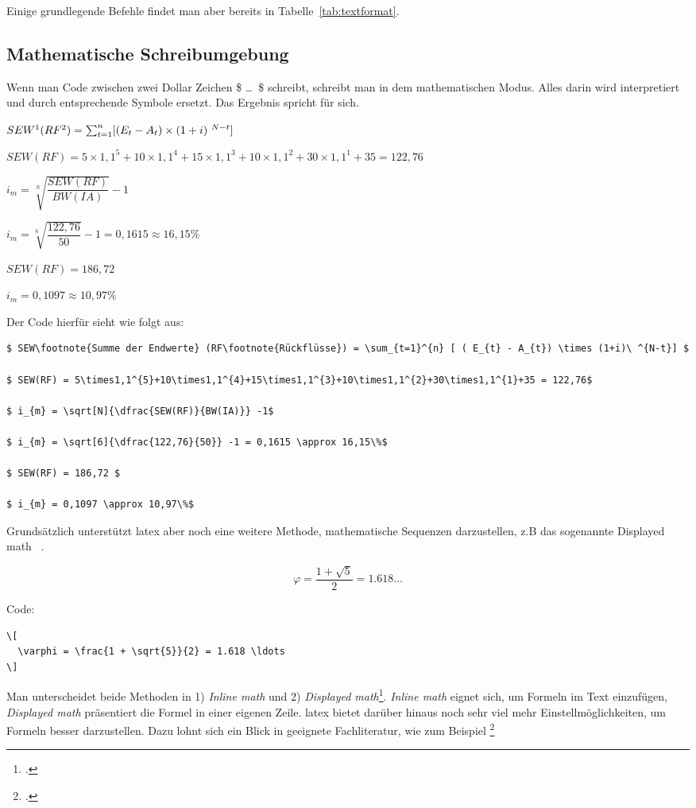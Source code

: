 Einige grundlegende Befehle findet man aber bereits in Tabelle~\ref{tab:textformat}.

\subsection{Mathematische Schreibumgebung}
\label{sec:math-umg}
Wenn man Code zwischen zwei Dollar Zeichen \$ \dots\ \$ schreibt, schreibt man in dem mathematischen Modus. Alles darin wird interpretiert und durch entsprechende Symbole ersetzt. Das Ergebnis spricht für sich.

$ SEW\footnote{Summe der Endwerte} (RF\footnote{Rückflüsse}) = \sum_{t=1}^{n} [ ( E_{t} - A_{t}) \times (1+i)\ ^{N-t}] $

$ SEW(RF) = 5\times1,1^{5}+10\times1,1^{4}+15\times1,1^{3}+10\times1,1^{2}+30\times1,1^{1}+35 = 122,76$

$ i_{m} = \sqrt[N]{\dfrac{SEW(RF)}{BW(IA)}} -1$

$ i_{m} = \sqrt[6]{\dfrac{122,76}{50}} -1 = 0,1615 \approx 16,15\%$

$ SEW(RF) = 186,72 $

$ i_{m} = 0,1097 \approx 10,97\%$

Der Code hierfür sieht wie folgt aus:
\begin{lstlisting}
$ SEW\footnote{Summe der Endwerte} (RF\footnote{Rückflüsse}) = \sum_{t=1}^{n} [ ( E_{t} - A_{t}) \times (1+i)\ ^{N-t}] $

$ SEW(RF) = 5\times1,1^{5}+10\times1,1^{4}+15\times1,1^{3}+10\times1,1^{2}+30\times1,1^{1}+35 = 122,76$

$ i_{m} = \sqrt[N]{\dfrac{SEW(RF)}{BW(IA)}} -1$

$ i_{m} = \sqrt[6]{\dfrac{122,76}{50}} -1 = 0,1615 \approx 16,15\%$

$ SEW(RF) = 186,72 $

$ i_{m} = 0,1097 \approx 10,97\%$
\end{lstlisting}

Grundsätzlich unterstützt \gls{latex} aber noch eine weitere Methode, mathematische Sequenzen darzustellen, z.B das sogenannte \glqq Displayed math \grqq\ .

\[
  \varphi = \frac{1 + \sqrt{5}}{2} = 1.618 \ldots
\]

Code:

\begin{lstlisting}
\[
  \varphi = \frac{1 + \sqrt{5}}{2} = 1.618 \ldots
\]
\end{lstlisting}

Man unterscheidet beide Methoden in 1) \emph{Inline math} und 2) \emph{Displayed math}\footcite[Vgl. ][S. 276]{kottwitzLaTeXCookbook902015}. \emph{Inline math} eignet sich, um Formeln im Text einzufügen, \emph{Displayed math} präsentiert die Formel in einer eigenen Zeile.
\gls{latex} bietet darüber hinaus noch sehr viel mehr Einstellmöglichkeiten, um Formeln besser darzustellen. Dazu lohnt sich ein Blick in geeignete Fachliteratur, wie zum Beispiel \footcite[Vgl. ][S. 35ff]{gratzerMoreMathLATEX2016}

